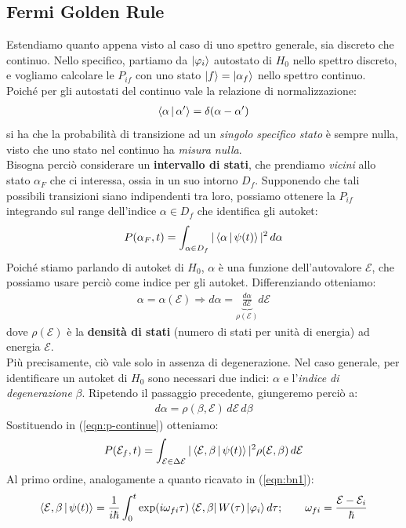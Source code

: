 \documentclass[../../InformazioneQuantistica.tex]{subfiles}
\begin{document}
\subsection{Fermi Golden Rule}
Estendiamo quanto appena visto al caso di uno spettro generale, sia discreto che continuo. Nello specifico, partiamo da $\Ket{\varphi_i}$ autostato di $H_0$ nello spettro discreto, e vogliamo calcolare le $P_{if}$ con uno stato $\Ket{f}=\Ket{\alpha_f}$ nello spettro continuo.\\
Poiché per gli autostati del continuo vale la relazione di normalizzazione:
\begin{align*}
\Braket{\alpha|\alpha'} = \delta(\alpha-\alpha')
\end{align*}
si ha che la probabilità di transizione ad un \textit{singolo specifico stato} è sempre nulla, visto che uno stato nel continuo ha \textit{misura nulla}.\\
Bisogna perciò considerare un \textbf{intervallo di stati}, che prendiamo \textit{vicini} allo stato $\alpha_F$ che ci interessa, ossia in un suo intorno $D_f$. Supponendo che tali possibili transizioni siano indipendenti tra loro, possiamo ottenere la $P_{if}$ integrando sul range dell'indice $\alpha \in D_f$ che identifica gli autoket:
\begin{align}
    P(\alpha_F,t) = \int_{\alpha \in D_f} |\Braket{\alpha|\psi(t)}|^2 \, d\alpha
    \label{eqn:p-continue}
\end{align}
Poiché stiamo parlando di autoket di $H_0$, $\alpha$ è una funzione dell'autovalore $\mathcal{E}$, che possiamo usare perciò come indice per gli autoket. Differenziando otteniamo:
\begin{align*}
    \alpha = \alpha(\mathcal{E}) \Rightarrow d\alpha = \underbrace{\frac{d\alpha}{d\mathcal{E}}}_{\rho(\mathcal{E})} d\mathcal{E}
\end{align*}
dove $\rho(\mathcal{E})$ è la \textbf{densità di stati} (numero di stati per unità di energia) ad energia $\mathcal{E}$.\\

Più precisamente, ciò vale solo in assenza di degenerazione. Nel caso generale, per identificare un autoket di $H_0$ sono necessari due indici: $\alpha$ e l'\textit{indice di degenerazione} $\beta$. Ripetendo il passaggio precedente, giungeremo perciò a:
\begin{align*}
    d\alpha = \rho(\beta, \mathcal{E})\, d\mathcal{E}\,d\beta
\end{align*}
Sostituendo in (\ref{eqn:p-continue}) otteniamo:
\begin{align}
    P(\mathcal{E}_f,t) = \int_{\mathcal{E} \in \Delta\mathcal{E}} |\Braket{\mathcal{E},\beta|\psi(t)}|^2 \rho(\mathcal{E},\beta)\, d\mathcal{E}
    \label{eqn:Pif-continue}
\end{align}
Al primo ordine, analogamente a quanto ricavato in (\ref{eqn:bn1}):
\begin{align*}
    \Braket{\mathcal{E},\beta|\psi(t)} = \frac{1}{i\hbar} \int_0^t \exp(i\omega_{fi}\tau) \Bra{\mathcal{E},\beta}W(\tau)\Ket{\varphi_i} d\tau; \qquad \omega_{fi} = \frac{\mathcal{E}-\mathcal{E}_i}{\hbar}
\end{align*}
\end{document}
